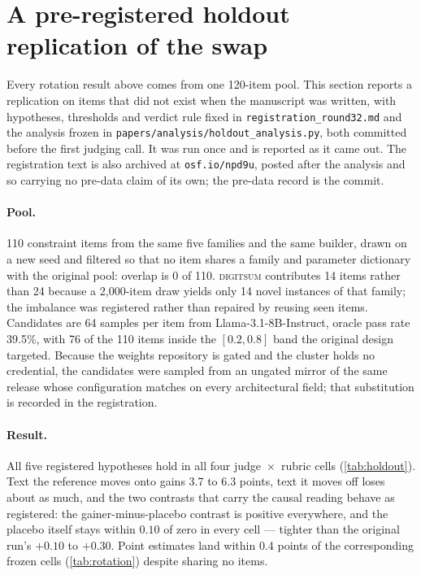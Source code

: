 \section{A pre-registered holdout replication of the swap}
\label{app:holdout}

Every rotation result above comes from one 120-item pool. This section reports a replication on
items that did not exist when the manuscript was written, with hypotheses, thresholds and verdict
rule fixed in \texttt{registration\_round32.md} and the analysis frozen in
\texttt{papers/analysis/holdout\_analysis.py}, both committed before the first judging call. It was run
once and is reported as it came out.\pre{} The registration text is also archived at \texttt{osf.io/npd9u},
posted after the analysis and so carrying no pre-data claim of its own; the pre-data record is the commit.

\paragraph{Pool.} 110 constraint items from the same five families and the same builder, drawn on a
new seed and filtered so that no item shares a family and parameter dictionary with the original
pool: overlap is 0 of 110. \textsc{digitsum} contributes 14 items rather than 24 because a
2{,}000-item draw yields only 14 novel instances of that family; the imbalance was registered rather
than repaired by reusing seen items. Candidates are 64 samples per item from Llama-3.1-8B-Instruct,
oracle pass rate 39.5\%, with 76 of the 110 items inside the $[0.2, 0.8]$ band the original design
targeted. Because the weights repository is gated and the cluster holds no credential, the
candidates were sampled from an ungated mirror of the same release whose configuration matches on
every architectural field; that substitution is recorded in the registration.

\paragraph{Result.} All five registered hypotheses hold in all four judge~$\times$~rubric cells
(\cref{tab:holdout}). Text the reference moves onto gains 3.7 to 6.3 points, text it moves off loses
about as much, and the two contrasts that carry the causal reading behave as registered: the
gainer-minus-placebo contrast is positive everywhere, and the placebo itself stays within $0.10$ of
zero in every cell --- tighter than the original run's $+0.10$ to $+0.30$. Point estimates land
within 0.4 points of the corresponding frozen cells (\cref{tab:rotation}) despite sharing no items.

